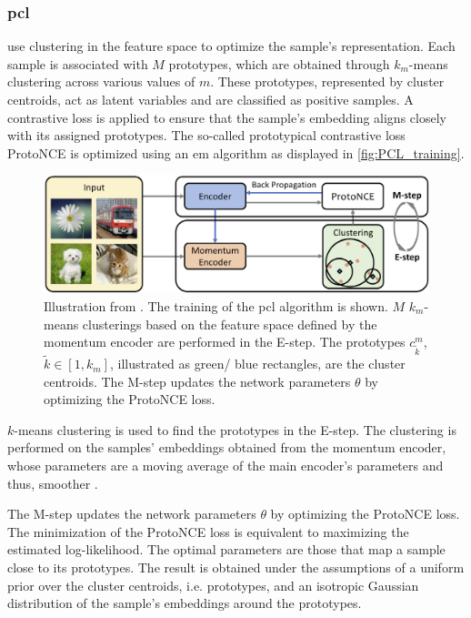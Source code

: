 \subsubsection{\acl{pcl}}\label{subsec:PCL}

\citet{PCL_2021} use clustering in the feature space to optimize the sample's representation.
Each sample is associated with $M$ prototypes, which are obtained through $k_m$-means clustering across various values of $m$.
These prototypes, represented by cluster centroids, act as latent variables and are classified as positive samples. 
A contrastive loss is applied to ensure that the sample's embedding aligns closely with its assigned prototypes.
The so-called prototypical contrastive loss ProtoNCE is optimized using an \ac{em} algorithm 
as displayed in \autoref{fig:PCL_training}.

\begin{figure}[!htb] %
    \centering
    \includegraphics[width=360pt]{images/PCL_training.png}
    \caption{Illustration from \citet{PCL_2021}.
    The training of the \ac{pcl} algorithm is shown.
    $M$ $k_m$-means clusterings based on the feature space defined by the momentum encoder 
    are performed in the E-step.
    The prototypes $c^m_{\tilde{k}}$, $\tilde{k} \in [1, k_m]$, illustrated as green/ blue rectangles, 
    are the cluster centroids.
    The M-step updates the network parameters $\theta$ by optimizing the ProtoNCE loss.
    }
    \label{fig:PCL_training}
\end{figure}

$k$-means clustering is used to find the prototypes in the E-step.
The clustering is performed on the samples' embeddings obtained from the momentum encoder, 
whose parameters are a moving average of the main encoder's parameters and thus, smoother \citep{PCL_2021}.

The M-step updates the network parameters $\theta$ by optimizing the ProtoNCE loss.
The minimization of the ProtoNCE loss is equivalent to maximizing the estimated log-likelihood.
The optimal parameters are those that map a sample close to its prototypes.
The result is obtained under the assumptions of a uniform prior over the cluster centroids, i.e. prototypes,
and an isotropic Gaussian distribution of the sample's embeddings around the prototypes.

